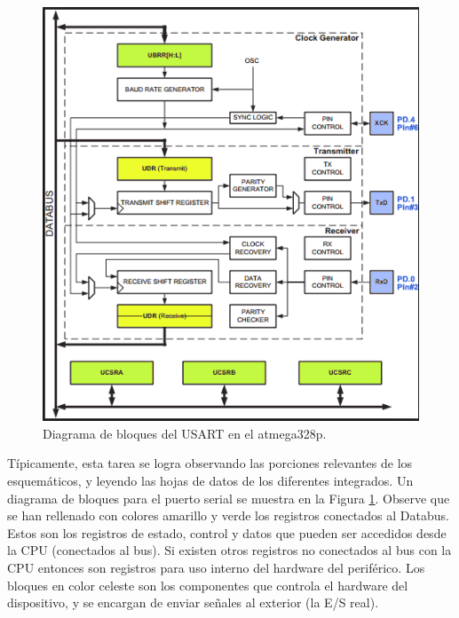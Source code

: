 \documentclass[output=paper, 
colorlinks,
citecolor=brown,
newtxmath
]{langscibook}
\begin{document}
\begin{figure}
\includegraphics[scale=0.60]{images/usart-block.png}
\caption{Diagrama de bloques del USART en el atmega328p.}
\label{fig:usart-block}
\end{figure}

Típicamente, esta tarea se logra  observando las porciones relevantes de los
esquemáticos, y leyendo las hojas de datos de los diferentes integrados.
Un diagrama de bloques para el puerto serial se muestra en la Figura \ref{fig:usart-block}.
Observe que se han rellenado con colores amarillo y verde los registros
conectados al Databus. Estos son los registros de estado, control y datos que
pueden ser accedidos desde la CPU (conectados al bus). Si existen otros 
registros no conectados al bus con la CPU entonces son registros para uso
interno del hardware del periférico. Los bloques en color celeste son los
componentes que controla el hardware del dispositivo, y se encargan de enviar
señales al exterior (la E/S real).
\end{document}
